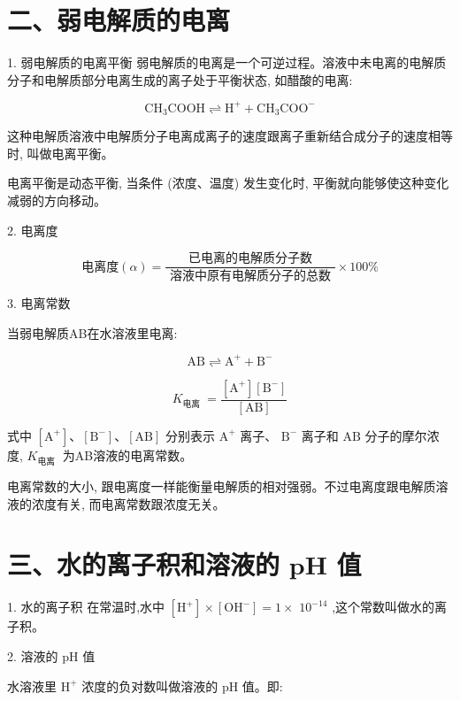 \documentclass[10pt]{article}
\begin{document}
\section*{二、弱电解质的电离}

1. 弱电解质的电离平衡 弱电解质的电离是一个可逆过程。溶液中未电离的电解质分子和电解质部分电离生成的离子处于平衡状态, 如醋酸的电离:

\[
{\mathrm{{CH}}}_{3}\mathrm{{COOH}} \rightleftharpoons {\mathrm{H}}^{ + } + {\mathrm{{CH}}}_{3}{\mathrm{{COO}}}^{ - }
\]

这种电解质溶液中电解质分子电离成离子的速度跟离子重新结合成分子的速度相等时, 叫做电离平衡。

电离平衡是动态平衡, 当条件 (浓度、温度) 发生变化时, 平衡就向能够使这种变化减弱的方向移动。

2. 电离度

\[
\text{电离度}\left( \alpha \right) = \frac{\text{ 已电离的电解质分子数 }}{\text{ 溶液中原有电解质分子的总数 }} \times {100}\%
\]

3. 电离常数

当弱电解质AB在水溶液里电离:

\[
\mathrm{{AB}} \rightleftharpoons {\mathrm{A}}^{ + } + {\mathrm{B}}^{ - }
\]

\[
{K}_{\text{电离 }} = \frac{\left\lbrack {\mathrm{A}}^{ + }\right\rbrack \left\lbrack {\mathrm{B}}^{ - }\right\rbrack }{\left\lbrack \mathrm{{AB}}\right\rbrack }
\]

式中 \(\left\lbrack {\mathrm{A}}^{ + }\right\rbrack \text{、}\left\lbrack {\mathrm{B}}^{ - }\right\rbrack \text{、}\left\lbrack \mathrm{{AB}}\right\rbrack\) 分别表示 \({\mathrm{A}}^{ + }\) 离子、 \({\mathrm{B}}^{ - }\) 离子和 \(\mathrm{{AB}}\) 分子的摩尔浓度, \({K}_{\text{电离 }}\) 为AB溶液的电离常数。

电离常数的大小, 跟电离度一样能衡量电解质的相对强弱。不过电离度跟电解质溶液的浓度有关, 而电离常数跟浓度无关。

\section*{三、水的离子积和溶液的 \(\mathbf{{pH}}\) 值}

1. 水的离子积 在常温时,水中 \(\left\lbrack {\mathrm{H}}^{ + }\right\rbrack \times \left\lbrack {\mathrm{{OH}}}^{ - }\right\rbrack = 1 \times\) \({10}^{-{14}}\) ,这个常数叫做水的离子积。

2. 溶液的 \(\mathrm{{pH}}\) 值

水溶液里 \({\mathrm{H}}^{ + }\) 浓度的负对数叫做溶液的 \(\mathrm{{pH}}\) 值。即:
\end{document}
